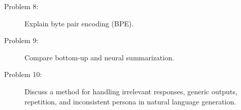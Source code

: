 \documentclass[10pt]{article}
\begin{document}
\begin{description}
\pagebreak

\item[Problem 8:]  Explain byte pair encoding (BPE).

\pagebreak

\item[Problem 9:]  Compare bottom-up and neural summarization.

\pagebreak


\item[Problem 10:]  Discuss a method for handling irrelevant responses, generic outputs, repetition, and inconsistent persona in natural language generation.


\end{description}
\end{document}
